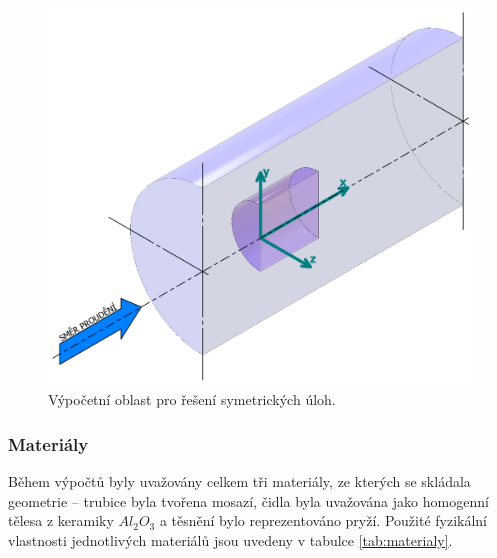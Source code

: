             \begin{figure}[ht!]
                \centering
                \includegraphics[width=\textwidth]{300_VYPOCETNI_MODEL/Vypocetni_oblast_symetrie.png}
                \caption{Výpočetní oblast pro řešení symetrických úloh.}
                \label{fig:vypocetni-oblast-symetrie}
            \end{figure}
         
	\newpage
        \subsubsection{Materiály}
            Během výpočtů byly uvažovány celkem tři materiály, ze kterých se skládala geometrie – trubice byla tvořena mosazí, čidla byla uvažována jako homogenní tělesa z keramiky $Al_2 O_3$ a těsnění bylo reprezentováno pryží. Použité fyzikální vlastnosti jednotlivých materiálů jsou uvedeny v tabulce \ref{tab:materialy}.
            
